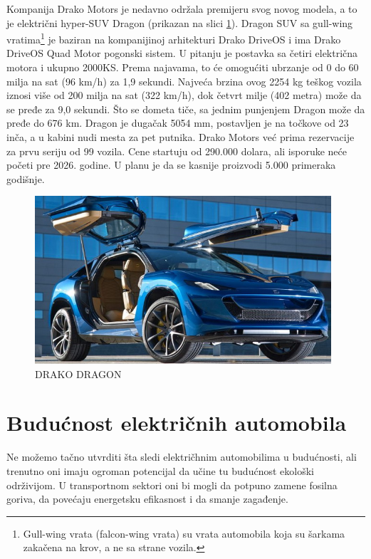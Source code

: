 \documentclass[a4paper]{article}
\begin{document}
    Kompanija Drako Motors je nedavno održala premijeru svog novog modela, a to je električni hyper-SUV Dragon (prikazan na slici \ref{fig:img_DRAKO}). 
    Dragon SUV sa gull-wing vratima\footnote{Gull-wing vrata (falcon-wing vrata) su vrata automobila koja su šarkama zakačena na krov, a ne sa strane vozila.} je baziran na kompanijinoj arhitekturi Drako DriveOS i ima Drako DriveOS Quad Motor pogonski sistem. U pitanju je postavka sa četiri električna motora i ukupno 2000KS. Prema najavama, to će omogućiti ubrzanje od 0 do 60 milja na sat (96 km/h) za 1,9 sekundi.
    Najveća brzina ovog 2254 kg teškog vozila iznosi više od 200 milja na sat (322 km/h), dok četvrt milje (402 metra) može da se pređe za 9,0 sekundi. Što se dometa tiče, sa jednim punjenjem Dragon može da pređe do 676 km. Dragon je dugačak 5054 mm, postavljen je na točkove od 23 inča, a u kabini nudi mesta za pet putnika.
    Drako Motors već prima rezervacije za prvu seriju od 99 vozila. Cene startuju od 290.000 dolara, ali isporuke neće početi pre 2026. godine. U planu je da se kasnije proizvodi 5.000 primeraka godišnje.
 
\begin{figure}[h]
        \centering
        \includegraphics[width=110mm,scale=0.5]{DRAKO.jpg}
        \caption{DRAKO DRAGON}
        \label{fig:img_DRAKO}
        \end{figure}

\newpage

\section{Budućnost električnih automobila}
\label {sec:buducnost}

Ne možemo tačno utvrditi šta sledi električhnim automobilima u budućnosti, ali trenutno oni imaju ogroman potencijal da učine tu budućnost ekološki održivijom. U transportnom sektori oni bi mogli da potpuno zamene fosilna goriva, da povećaju energetsku efikasnost i da smanje zagađenje.
\end{document}
